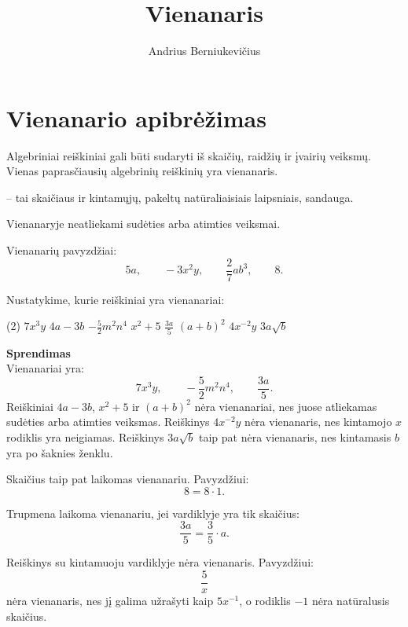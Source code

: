 \documentclass[11pt,a4paper]{scrartcl}
\title{Vienanaris}
\author{Andrius Berniukevičius}
\begin{document}
\maketitle

\section{Vienanario apibrėžimas}

Algebriniai reiškiniai gali būti sudaryti iš skaičių, raidžių ir įvairių veiksmų. Vienas paprasčiausių algebrinių reiškinių yra vienanaris.

\begin{definition}
 -- tai skaičiaus ir kintamųjų, pakeltų natūraliaisiais laipsniais, sandauga.

Vienanaryje neatliekami sudėties arba atimties veiksmai.
\end{definition}

Vienanarių pavyzdžiai:
\[
5a, \qquad -3x^2y, \qquad \frac{2}{7}ab^3, \qquad 8.
\]

\begin{example}
Nustatykime, kurie reiškiniai yra vienanariai:

\begin{tasks}[style=itemize](2)
    \task $7x^3y$
    \task $4a-3b$
    \task $-\frac{5}{2}m^2n^4$
    \task $x^2+5$
    \task $\frac{3a}{5}$
    \task $(a+b)^2$
    \task $4x^{-2}y$
    \task $3a\sqrt{b}$
\end{tasks}
\textbf{Sprendimas}\\
Vienanariai yra:
\[
7x^3y, \qquad -\frac{5}{2}m^2n^4, \qquad \frac{3a}{5}.
\]
Reiškiniai $4a-3b$, $x^2+5$ ir $(a+b)^2$ nėra vienanariai, nes juose atliekamas sudėties arba atimties veiksmas. Reiškinys $4x^{-2}y$ nėra vienanaris, nes kintamojo $x$ rodiklis yra neigiamas. Reiškinys $3a\sqrt{b}$ taip pat nėra vienanaris, nes kintamasis $b$ yra po šaknies ženklu.
\end{example}

\begin{remark}
Skaičius taip pat laikomas vienanariu. Pavyzdžiui:
\[
8=8 \cdot 1.
\]

Trupmena laikoma vienanariu, jei vardiklyje yra tik skaičius:
\[
\frac{3a}{5}=\frac{3}{5}\cdot a.
\]
\end{remark}

\begin{remark}
Reiškinys su kintamuoju vardiklyje nėra vienanaris. Pavyzdžiui:
\[
\frac{5}{x}
\]
nėra vienanaris, nes jį galima užrašyti kaip $5x^{-1}$, o rodiklis $-1$ nėra natūralusis skaičius.
\end{remark}
\end{document}
